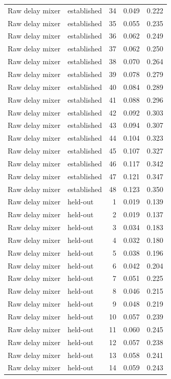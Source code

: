 \begin{tabular}{llrrr}
Raw delay mixer & established & 34 & 0.049 & 0.222 \\
Raw delay mixer & established & 35 & 0.055 & 0.235 \\
Raw delay mixer & established & 36 & 0.062 & 0.249 \\
Raw delay mixer & established & 37 & 0.062 & 0.250 \\
Raw delay mixer & established & 38 & 0.070 & 0.264 \\
Raw delay mixer & established & 39 & 0.078 & 0.279 \\
Raw delay mixer & established & 40 & 0.084 & 0.289 \\
Raw delay mixer & established & 41 & 0.088 & 0.296 \\
Raw delay mixer & established & 42 & 0.092 & 0.303 \\
Raw delay mixer & established & 43 & 0.094 & 0.307 \\
Raw delay mixer & established & 44 & 0.104 & 0.323 \\
Raw delay mixer & established & 45 & 0.107 & 0.327 \\
Raw delay mixer & established & 46 & 0.117 & 0.342 \\
Raw delay mixer & established & 47 & 0.121 & 0.347 \\
Raw delay mixer & established & 48 & 0.123 & 0.350 \\
Raw delay mixer & held-out & 1 & 0.019 & 0.139 \\
Raw delay mixer & held-out & 2 & 0.019 & 0.137 \\
Raw delay mixer & held-out & 3 & 0.034 & 0.183 \\
Raw delay mixer & held-out & 4 & 0.032 & 0.180 \\
Raw delay mixer & held-out & 5 & 0.038 & 0.196 \\
Raw delay mixer & held-out & 6 & 0.042 & 0.204 \\
Raw delay mixer & held-out & 7 & 0.051 & 0.225 \\
Raw delay mixer & held-out & 8 & 0.046 & 0.215 \\
Raw delay mixer & held-out & 9 & 0.048 & 0.219 \\
Raw delay mixer & held-out & 10 & 0.057 & 0.239 \\
Raw delay mixer & held-out & 11 & 0.060 & 0.245 \\
Raw delay mixer & held-out & 12 & 0.057 & 0.238 \\
Raw delay mixer & held-out & 13 & 0.058 & 0.241 \\
Raw delay mixer & held-out & 14 & 0.059 & 0.243 \\

\end{tabular}
